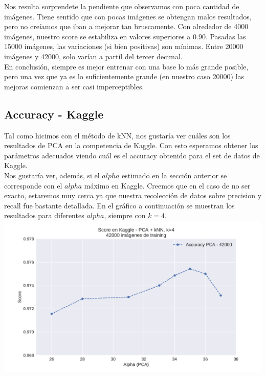 Nos resulta sorprendete la pendiente que observamos con poca cantidad de imágenes. Tiene sentido que con pocas imágenes se obtengan malos resultados, pero no creíamos que iban a mejorar tan bruscamente. Con alrededor de 4000 imágenes, nuestro score se estabiliza en valores superiores a 0.90. Pasadas las 15000 imágenes, las variaciones (si bien positivas) son mínimas. Entre 20000 imágenes y 42000, solo varían a partil del tercer decimal. \\

En conclusión, siempre es mejor entrenar con una base lo más grande posible, pero una vez que ya es lo suficientemente grande (en nuestro caso 20000) las mejoras comienzan a ser casi imperceptibles. \\

\subsection{Accuracy - Kaggle}

Tal como hicimos con el método de kNN, nos gustaría ver cuáles son los resultados de PCA en la competencia de Kaggle. Con esto esperamos obtener los parámetros adecuados viendo cuál es el accuracy obtenido para el set de datos de Kaggle. \\

Nos gustaría ver, además, si el $alpha$ estimado en la sección anterior se corresponde con el $alpha$ máximo en Kaggle. Creemos que en el caso de no ser exacto, estaremos muy cerca ya que nuestra recolección de datos sobre precision y recall fue bastante detallada. En el gráfico a continuación se muestran los resultados para diferentes $alpha$, siempre con $k=4$. \\

{\centering
    \includegraphics[scale=0.55]{informe/imagenes/pca/clasificacionKaggleREENTREGA.pdf} \\
}
$ $\newline

